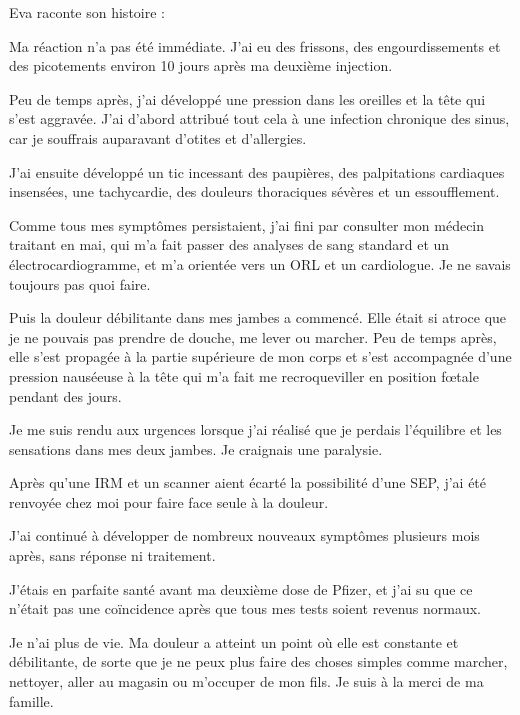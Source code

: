 Eva raconte son histoire :

Ma réaction n'a pas été immédiate. J'ai eu des frissons, des engourdissements et
des picotements environ 10 jours après ma deuxième injection.

Peu de temps après, j'ai développé une pression dans les oreilles et la tête qui
s'est aggravée. J'ai d'abord attribué tout cela à une infection chronique des
sinus, car je souffrais auparavant d'otites et d'allergies.

J'ai ensuite développé un tic incessant des paupières, des palpitations
cardiaques insensées, une tachycardie, des douleurs thoraciques sévères et un
essoufflement.

Comme tous mes symptômes persistaient, j'ai fini par consulter mon médecin
traitant en mai, qui m'a fait passer des analyses de sang standard et un
électrocardiogramme, et m'a orientée vers un ORL et un cardiologue. Je ne savais
toujours pas quoi faire.

Puis la douleur débilitante dans mes jambes a commencé. Elle était si atroce que
je ne pouvais pas prendre de douche, me lever ou marcher. Peu de temps après,
elle s'est propagée à la partie supérieure de mon corps et s'est accompagnée
d'une pression nauséeuse à la tête qui m'a fait me recroqueviller en position
fœtale pendant des jours.

Je me suis rendu aux urgences lorsque j'ai réalisé que je perdais l'équilibre et
les sensations dans mes deux jambes. Je craignais une paralysie.

Après qu'une IRM et un scanner aient écarté la possibilité d'une SEP, j'ai été
renvoyée chez moi pour faire face seule à la douleur.

J'ai continué à développer de nombreux nouveaux symptômes plusieurs mois après,
sans réponse ni traitement.

J'étais en parfaite santé avant ma deuxième dose de Pfizer, et j'ai su que ce
n'était pas une coïncidence après que tous mes tests soient revenus normaux.

Je n'ai plus de vie. Ma douleur a atteint un point où elle est constante et
débilitante, de sorte que je ne peux plus faire des choses simples comme
marcher, nettoyer, aller au magasin ou m'occuper de mon fils. Je suis à la merci
de ma famille.

